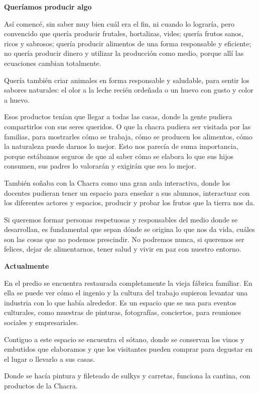 \textbf{Queríamos producir algo}

Así comencé, sin saber muy bien cuál era el fin, ni cuando lo lograría,
pero convencido que quería producir frutales, hortalizas, vides; quería
frutos sanos, ricos y sabrosos; quería producir alimentos de una forma
responsable y eficiente; no quería producir dinero y utilizar la
producción como medio, porque allí las ecuaciones cambian totalmente.

Quería también criar animales en forma responsable y saludable, para
sentir los sabores naturales: el olor a la leche recién ordeñada o un
huevo con gusto y color a huevo.

Esos productos tenían que llegar a todas las casas, donde la gente
pudiera compartirlos con sus seres queridos. O que la chacra pudiera ser
visitada por las familias, para mostrarles cómo se trabaja, cómo se
producen los alimentos, cómo la naturaleza puede darnos lo mejor. Esto
nos parecía de suma importancia, porque estábamos seguros de que al
saber cómo se elabora lo que sus hijos consumen, sus padres lo valorarán
y exigirán que sea lo mejor.

También soñaba con la Chacra como una gran aula interactiva, donde los
docentes pudieran tener un espacio para enseñar a sus alumnos,
interactuar con los diferentes actores y espacios, producir y probar los
frutos que la tierra nos da.

Si queremos formar personas respetuosas y responsables del medio donde
se desarrollan, es fundamental que sepan dónde se origina lo que nos da
vida, cuáles son las cosas que no podemos prescindir. No podremos nunca,
si queremos ser felices, dejar de alimentarnos, tener salud y vivir en
paz con nuestro entorno.

\textbf{Actualmente}

En el predio se encuentra restaurada completamente la vieja fábrica
familiar. En ella se puede ver cómo el ingenio y la cultura del trabajo
supieron levantar una industria con lo que había alrededor. Es un
espacio que se usa para eventos culturales, como muestras de pinturas,
fotografías, conciertos, para reuniones sociales y empresariales.

Contiguo a este espacio se encuentra el sótano, donde se conservan los
vinos y embutidos que elaboramos y que los visitantes pueden comprar
para degustar en el lugar o llevarlo a sus casas.

Donde se hacía pintura y fileteado de sulkys y carretas, funciona la
cantina, con productos de la Chacra.

